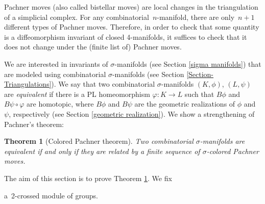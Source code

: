 \documentclass[a4paper, oneside]{amsart}
\numberwithin{equation}{subsection}
\theoremstyle{referencedlemma}
\theoremstyle{plain} %
\newtheorem{thm}{Theorem}
\theoremstyle{remark}
\begin{document}
Pachner moves (also called bistellar moves) are local changes in the triangulation of a simplicial complex. For any combinatorial~$n$-manifold, there are only~$n+1$ different types of Pachner moves.  Therefore, in order to check that some quantity is a diffeomorphism invariant of closed 4-manifolds,  it suffices to check that it does not change under the (finite list of) Pachner moves.  

We are interested in invariants of $\sigma$-manifolds (see Section \ref{sigma manifolds}) that are modeled using combinatorial \mbox{$\sigma$-mani}folds (see Section \ref{Section-Triangulations}).  We say that two combinatorial $\sigma$-manifolds $(K,\phi)$, $(L, \psi)$ are \emph{equivalent} if there is a PL homeomorphism $\varphi \colon K \to L$ such that $B\phi$ and $B\psi \circ \varphi$ are homotopic, where $B\phi$ and $B\psi$ are the geometric realizations of $\phi$ and $\psi$, respectively (see Section \ref{geometric realization}).  We show a strengthening of Pachner's theorem:

\begin{thm}[Colored Pachner theorem]\label{Theorem - Colored Pachner}
Two combinatorial $\sigma$-manifolds are equivalent if and only if they are related by a finite sequence of $\sigma$-colored Pachner moves.
\end{thm}

The aim of this section is to prove Theorem \ref{Theorem - Colored Pachner}. We fixa~2-crossed module of groups. 
\end{document}
